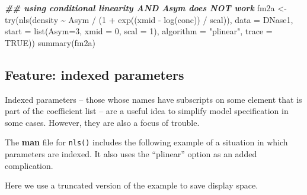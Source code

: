 \documentclass[
]{article}
\newenvironment{Shaded}{\begin{snugshade}}{\end{snugshade}}
\newcommand{\AttributeTok}[1]{\textcolor[rgb]{0.77,0.63,0.00}{#1}}
\newcommand{\ConstantTok}[1]{\textcolor[rgb]{0.00,0.00,0.00}{#1}}
\newcommand{\DecValTok}[1]{\textcolor[rgb]{0.00,0.00,0.81}{#1}}
\newcommand{\DocumentationTok}[1]{\textcolor[rgb]{0.56,0.35,0.01}{\textbf{\textit{#1}}}}
\newcommand{\FunctionTok}[1]{\textcolor[rgb]{0.00,0.00,0.00}{#1}}
\newcommand{\NormalTok}[1]{#1}
\newcommand{\OtherTok}[1]{\textcolor[rgb]{0.56,0.35,0.01}{#1}}
\newcommand{\SpecialCharTok}[1]{\textcolor[rgb]{0.00,0.00,0.00}{#1}}
\newcommand{\StringTok}[1]{\textcolor[rgb]{0.31,0.60,0.02}{#1}}
\begin{document}
\begin{Shaded}
\begin{Highlighting}[]
\DocumentationTok{\#\# using conditional linearity AND Asym does NOT work}
\NormalTok{fm2a }\OtherTok{\textless{}{-}} \FunctionTok{try}\NormalTok{(}\FunctionTok{nls}\NormalTok{(density }\SpecialCharTok{\textasciitilde{}}\NormalTok{ Asym }\SpecialCharTok{/}\NormalTok{ (}\DecValTok{1} \SpecialCharTok{+} \FunctionTok{exp}\NormalTok{((xmid }\SpecialCharTok{{-}} \FunctionTok{log}\NormalTok{(conc)) }\SpecialCharTok{/}\NormalTok{ scal)), }
                 \AttributeTok{data =}\NormalTok{ DNase1, }\AttributeTok{start =} \FunctionTok{list}\NormalTok{(}\AttributeTok{Asym=}\DecValTok{3}\NormalTok{, }\AttributeTok{xmid =} \DecValTok{0}\NormalTok{, }\AttributeTok{scal =} \DecValTok{1}\NormalTok{),}
                 \AttributeTok{algorithm =} \StringTok{"plinear"}\NormalTok{, }\AttributeTok{trace =} \ConstantTok{TRUE}\NormalTok{))}
\FunctionTok{summary}\NormalTok{(fm2a)}
\end{Highlighting}
\end{Shaded}

\hypertarget{feature-indexed-parameters}{%
\subsection{Feature: indexed
parameters}\label{feature-indexed-parameters}}

Indexed parameters -- those whose names have subscripts on some element
that is part of the coefficient list -- are a useful idea to simplify
model specification in some cases. However, they are also a focus of
trouble.

The \textbf{man} file for \texttt{nls()} includes the following example
of a situation in which parameters are indexed. It also uses the
``plinear'' option as an added complication.

Here we use a truncated version of the example to save display space.
\end{document}
